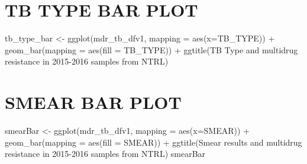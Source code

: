 \documentclass[
]{report}
\newenvironment{Shaded}{\begin{snugshade}}{\end{snugshade}}
\newcommand{\AttributeTok}[1]{\textcolor[rgb]{0.40,0.45,0.13}{#1}}
\newcommand{\FunctionTok}[1]{\textcolor[rgb]{0.28,0.35,0.67}{#1}}
\newcommand{\NormalTok}[1]{\textcolor[rgb]{0.00,0.23,0.31}{#1}}
\newcommand{\OtherTok}[1]{\textcolor[rgb]{0.00,0.23,0.31}{#1}}
\newcommand{\SpecialCharTok}[1]{\textcolor[rgb]{0.37,0.37,0.37}{#1}}
\newcommand{\StringTok}[1]{\textcolor[rgb]{0.13,0.47,0.30}{#1}}
\begin{document}
\hypertarget{tb-type-bar-plot}{%
\section{TB TYPE BAR PLOT}\label{tb-type-bar-plot}}

\begin{Shaded}
\begin{Highlighting}[]
\NormalTok{tb\_type\_bar }\OtherTok{\textless{}{-}} \FunctionTok{ggplot}\NormalTok{(mdr\_tb\_dfv1, }\AttributeTok{mapping =} \FunctionTok{aes}\NormalTok{(}\AttributeTok{x=}\NormalTok{TB\_TYPE)) }\SpecialCharTok{+} \FunctionTok{geom\_bar}\NormalTok{(}\AttributeTok{mapping =} \FunctionTok{aes}\NormalTok{(}\AttributeTok{fill =}\NormalTok{ TB\_TYPE)) }\SpecialCharTok{+} \FunctionTok{ggtitle}\NormalTok{(}\StringTok{\textquotesingle{}TB Type and multidrug resistance}
\StringTok{                                                                                                                 in 2015{-}2016 samples from NTRL\textquotesingle{}}\NormalTok{)}
\end{Highlighting}
\end{Shaded}

\hypertarget{smear-bar-plot}{%
\section{SMEAR BAR PLOT}\label{smear-bar-plot}}

\begin{Shaded}
\begin{Highlighting}[]
\NormalTok{smearBar }\OtherTok{\textless{}{-}} \FunctionTok{ggplot}\NormalTok{(mdr\_tb\_dfv1, }\AttributeTok{mapping =} \FunctionTok{aes}\NormalTok{(}\AttributeTok{x=}\NormalTok{SMEAR)) }\SpecialCharTok{+} \FunctionTok{geom\_bar}\NormalTok{(}\AttributeTok{mapping =} \FunctionTok{aes}\NormalTok{(}\AttributeTok{fill =}\NormalTok{ SMEAR)) }\SpecialCharTok{+} \FunctionTok{ggtitle}\NormalTok{(}\StringTok{\textquotesingle{}Smear results and multidrug resistance in 2015{-}2016 samples from NTRL\textquotesingle{}}\NormalTok{)}
\NormalTok{smearBar }
\end{Highlighting}
\end{Shaded}
\end{document}
